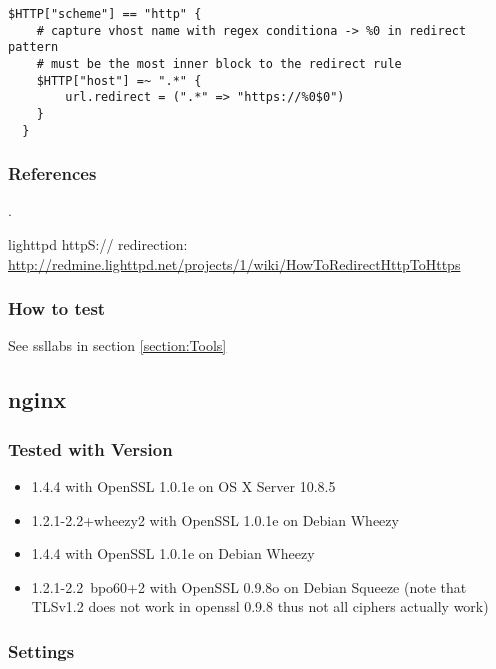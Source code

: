 \begin{lstlisting}[breaklines]
  $HTTP["scheme"] == "http" {
    # capture vhost name with regex conditiona -> %0 in redirect pattern
    # must be the most inner block to the redirect rule
    $HTTP["host"] =~ ".*" {
        url.redirect = (".*" => "https://%0$0")
    }
  }
\end{lstlisting}


\subsubsection{References} .

lighttpd httpS:// redirection: \url{http://redmine.lighttpd.net/projects/1/wiki/HowToRedirectHttpToHttps}


\subsubsection{How to test} 
See ssllabs in section \ref{section:Tools}



\subsection{nginx}

\subsubsection{Tested with Version} 
\begin{itemize}
\item 1.4.4 with OpenSSL 1.0.1e on OS X Server 10.8.5
\item 1.2.1-2.2+wheezy2 with OpenSSL 1.0.1e on Debian Wheezy
\item 1.4.4 with OpenSSL 1.0.1e on Debian Wheezy
\item 1.2.1-2.2~bpo60+2 with OpenSSL 0.9.8o on Debian Squeeze (note that TLSv1.2 does not work in openssl 0.9.8 thus not all ciphers actually work)
\end{itemize}


\subsubsection{Settings}

